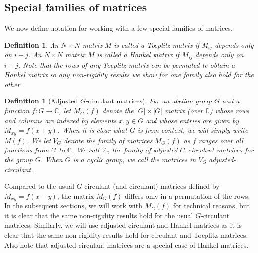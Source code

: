 \documentclass{toc}
\newtheorem{define}[theorem]{Definition}
\renewcommand\C{{\mathbb{C}}}
\begin{document}
%
\subsection{Special families of matrices} \label{sec:specialmatrices}   %
We now define notation for working with a few special families of matrices.
\begin{define}
An $N \times N$ matrix $M$ is called a Toeplitz matrix if $M_{ij}$ depends only on $i-j$.  An $N \times N$ matrix $M$ is called a Hankel matrix if $M_{ij}$ depends only on $i + j$.  Note that the rows of any Toeplitz matrix can be permuted to obtain a Hankel matrix so any non-rigidity results we show for one family also hold for the other.
\end{define}


\begin{define}[Adjusted $G$-circulant matrices] %
For an abelian group $G$ and a function $f: G \rightarrow \C$, let $M_G(f)$ denote the $|G| \times |G|$ matrix (over $\C$) whose rows and columns are indexed by elements $x,y \in G$ and whose entries are given by $M_{xy} = f(x + y)$.  When it is clear what $G$ is from context, we will simply write $M(f)$.  We let $V_G$ denote the family of matrices $M_G(f)$ as $f$ ranges over all functions from $G$ to $\C$.  We call $V_G$ the family of 
\emph{adjusted   %
%
$G$-circulant    %
matrices} for the group $G$.  When $G$ is a cyclic group, we call the matrices in $V_G$ adjusted-circulant. 
\end{define}
Compared to the usual 
%
$G$-circulant    %
(and circulant) matrices defined by $M_{xy} =  f(x-y)$, the matrix $M_G(f)$ differs only in a permutation of the rows.  In the
%
%
subsequent  %
sections, we will work with $M_G(f)$ for technical reasons, but it is clear that the same non-rigidity results hold for the usual 
%
$G$-circulant    %
matrices.  Similarly, we will use adjusted-circulant and Hankel matrices as it is clear that the same non-rigidity results hold for circulant and Toeplitz matrices.  Also note that adjusted-circulant matrices are a special case of Hankel matrices.

%
%
%
%
%
%
%
%
%
%
%

%
\end{document}
